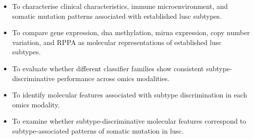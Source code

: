 \begin{itemize}
    \item To characterise clinical characteristics, immune microenvironment, and somatic mutation patterns associated with established \gls{lusc} subtypes.
    \item To compare gene expression, \gls{dna} methylation, \gls{mirna} expression, copy number variation, and RPPA as molecular representations of established \gls{lusc} subtypes.
    \item To evaluate whether different classifier families show consistent subtype-discriminative performance across omics modalities.
    \item To identify molecular features associated with subtype discrimination in each omics modality. %
    \item To examine whether subtype-discriminative molecular features correspond to subtype-associated patterns of somatic mutation in \gls{lusc}.

\end{itemize}